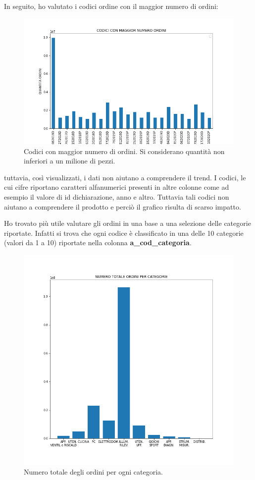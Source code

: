 \documentclass[10pt,a4paper]{report}
\begin{document}
In seguito, ho valutato i codici ordine con il maggior numero di ordini:
\begin{figure}[htb]
\centering
\includegraphics[scale=.5]{ordini_codici_hist.png}
\caption{Codici con maggior numero di ordini. Si considerano quantità non inferiori a un milione di pezzi.}
\label{pie}
\end{figure}
tuttavia, così visualizzati, i dati non aiutano a comprendere il trend. I codici, le cui cifre riportano caratteri alfanumerici presenti in altre colonne come ad esempio il valore di id dichiarazione, anno  e altro. Tuttavia tali codici non aiutano a comprendere il prodotto e perciò il grafico risulta di scarso impatto.

Ho trovato più utile valutare gli ordini in una base a una selezione delle categorie riportate. Infatti si trova che ogni codice è classificato in una delle 10 categorie (valori da 1 a 10) riportate nella colonna \textbf{a\_cod\_categoria}. 

\begin{figure}[htb]
\centering
\includegraphics[scale=.5]{ordini_categorie_hist.png}
\caption{Numero totale degli ordini per ogni categoria.}
\label{hist}
\end{figure}
\end{document}
